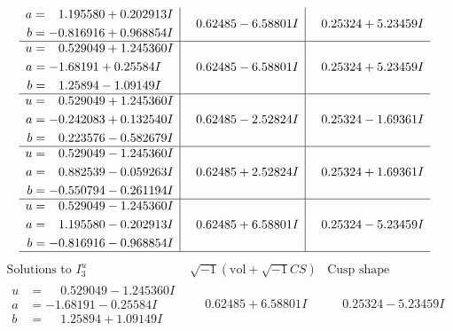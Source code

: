 \documentclass[1p]{elsarticle_modified}
\theoremstyle{definition}
\newcommand{\I}{\sqrt{-1}}
\begin{document}
$$\begin{array}{c|c|c}
\begin{aligned}
a &= \phantom{-}1.195580 + 0.202913 I \\
b &= -0.816916 + 0.968854 I\end{aligned}
 & \phantom{-}0.62485 - 6.58801 I & \phantom{-}0.25324 + 5.23459 I \\ \hline\begin{aligned}
u &= \phantom{-}0.529049 + 1.245360 I \\
a &= -1.68191 + 0.25584 I \\
b &= \phantom{-}1.25894 - 1.09149 I\end{aligned}
 & \phantom{-}0.62485 - 6.58801 I & \phantom{-}0.25324 + 5.23459 I \\ \hline\begin{aligned}
u &= \phantom{-}0.529049 + 1.245360 I \\
a &= -0.242083 + 0.132540 I \\
b &= \phantom{-}0.223576 - 0.582679 I\end{aligned}
 & \phantom{-}0.62485 - 2.52824 I & \phantom{-}0.25324 - 1.69361 I \\ \hline\begin{aligned}
u &= \phantom{-}0.529049 - 1.245360 I \\
a &= \phantom{-}0.882539 - 0.059263 I \\
b &= -0.550794 - 0.261194 I\end{aligned}
 & \phantom{-}0.62485 + 2.52824 I & \phantom{-}0.25324 + 1.69361 I \\ \hline\begin{aligned}
u &= \phantom{-}0.529049 - 1.245360 I \\
a &= \phantom{-}1.195580 - 0.202913 I \\
b &= -0.816916 - 0.968854 I\end{aligned}
 & \phantom{-}0.62485 + 6.58801 I & \phantom{-}0.25324 - 5.23459 I\\
 \hline 
 \end{array}$$\newpage$$\begin{array}{c|c|c}  
\text{Solutions to }I^u_{3}& \I (\text{vol} + \sqrt{-1}CS) & \text{Cusp shape}\\
 \hline 
\begin{aligned}
u &= \phantom{-}0.529049 - 1.245360 I \\
a &= -1.68191 - 0.25584 I \\
b &= \phantom{-}1.25894 + 1.09149 I\end{aligned}
 & \phantom{-}0.62485 + 6.58801 I & \phantom{-}0.25324 - 5.23459 I \\ \hline\begin{aligned}

\end{aligned}
\end{array}$$
\end{document}
